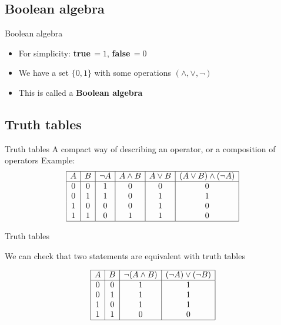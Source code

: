 \documentclass[11pt]{beamer}
\theoremstyle{definition}
\begin{document}
\subsection{Boolean algebra}

\begin{frame}{Boolean algebra}
  \begin{itemize}
    \item For simplicity: \textbf{true}\,$=1$, \textbf{false}\,$=0$
    \pause \item We have a set $\{0,1\}$ with some operations
                 $(\land,\lor,\neg)$
    \pause \item This is called a \textbf{Boolean algebra}
  \end{itemize}
\end{frame}

\subsection{Truth tables}

\begin{frame}{Truth tables}
  A compact way of describing an operator, or a composition of operators
  \pause
  \vspace{4pt}
  Example:
\begin{align*}
  \begin{array}{|c|c|c|c|c|c|}
    \hline
    A & B & \neg A & A\land B & A\lor B & (A\lor B)\land (\neg A)  \\
    \hline
    0 & 0 & 1 & 0 & 0 & 0 \\
    0 & 1 & 1 & 0 & 1 & 1 \\
    1 & 0 & 0 & 0 & 1 & 0 \\
    1 & 1 & 0 & 1 & 1 & 0 \\
    \hline
  \end{array}
\end{align*}
\end{frame}

\begin{frame}{Truth tables}
  \begin{center}
    We can check that two statements are equivalent with truth tables
  \end{center}
\begin{align*}
  \begin{array}{|c|c|c|c|}
    \hline
    A & B & \neg(A\land B) & (\neg A)\lor (\neg B)\\
    \hline
    0 & 0 & 1 & 1 \\
    0 & 1 & 1 & 1 \\
    1 & 0 & 1 & 1 \\
    1 & 1 & 0 & 0 \\
    \hline
  \end{array}
\end{align*}
\end{frame}
\end{document}
